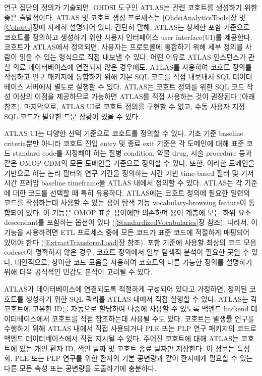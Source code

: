 \documentclass[10.5pt]{book}
\theoremstyle{definition}
\theoremstyle{definition}
\theoremstyle{definition}
\theoremstyle{remark}
\begin{document}
연구 집단의 정의가 기술되면, OHDSI 도구인 ATLAS는 관련 코호트를 생성하기
위한 좋은 출발점이다. ATLAS 및 코호트 생성 프로세스는
\ref{OhdsiAnalyticsTools}장 및 \ref{Cohorts}장에 자세히 설명되어 있다.
간단히 말해, ATLAS는 상세한 포함 기준으로 코호트를 정의하고 생성하기
위한 사용자 인터페이스 user interface(UI)를 제공한다. 코호트가 ATLAS에서
정의되면, 사용자는 프로토콜에 통합하기 위해 세부 정의를 사람이 읽을 수
있는 형식으로 직접 내보낼 수 있다. 어떤 이유로 ATLAS 인스턴스가 관찰
의료 데이터베이스에 연결되지 않은 경우에도, ATLAS를 사용하여 코호트
정의를 작성하고 연구 패키지에 통합하기 위해 기본 SQL 코드를 직접
내보내서 SQL 데이터베이스 서버에서 별도로 실행할 수 있다. ATLAS는 코호트
정의를 위한 SQL 코드 작성 이상의 이점을 제공하므로 가능하면 ATLAS를 직접
사용하는 것이 권장된다 (아래 참조). 마지막으로, ATLAS UI로 코호트 정의를
구현할 수 없고, 수동 사용자 지정 SQL 코드가 필요한 드문 상황이 있을 수
있다.

ATLAS UI는 다양한 선택 기준으로 코호트를 정의할 수 있다. 기초 기준
baseline criteria뿐만 아니라 코호트 진입 entry 및 종료 exit 기준은 각
도메인에 대해 표준 코드 standard code를 지정해야 하는 질병 condition,
약물 drug, 시술 procedure 등과 같은 OMOP CDM의 모든 도메인을 기준으로
정의할 수 있다. 또한, 이러한 도메인을 기반으로 하는 논리 필터와 연구
기간을 정의하는 시간 기반 time-based 필터 및 기저 시간 프레임 baseline
timeframe을 ATLAS 내에서 정의할 수 있다. ATLAS는 각 기준에 대한 코드를
선택할 때 특히 유용하다. ATLAS에는 코호트 정의에 필요한 일련의 코드를
작성하는데 사용할 수 있는 용어 탐색 기능 vocabulary-browsing feature이
통합되어 있다. 이 기능은 OMOP 표준 용어에만 의존하며 용어 계층에 모든
하위 요소 descendant를 포함하는 옵션이 있다
(\ref{StandardizedVocabularies}장 참조). 따라서, 이 기능을 사용하려면
ETL 프로세스 중에 모든 코드가 표준 코드에 적절하게 매핑되어 있어야 한다
(\ref{ExtractTransformLoad}장 참조). 포함 기준에 사용할 최상의 코드 모음
codeset이 명확하지 않은 경우, 코호트 정의에서 일부 탐색적 분석이 필요한
곳일 수 있다. 대안적으로, 상이한 코드 모음을 사용하여 코호트의 다른
가능한 정의를 설명하기 위해 더욱 공식적인 민감도 분석이 고려될 수 있다.

ATLAS가 데이터베이스에 연결되도록 적절하게 구성되어 있다고 가정하면,
정의된 코호트를 생성하기 위한 SQL 쿼리를 ATLAS 내에서 직접 실행할 수
있다. ATLAS는 각 코호트에 고유한 ID를 자동으로 할당하여 나중에 사용할 수
있도록 백엔드 backend 데이터베이스에서 코호트를 직접 참조하는데 사용될
수도 있다. 코호트는 발생률 연구를 수행하기 위해 ATLAS 내에서 직접
사용되거나 PLE 또는 PLP 연구 패키지의 코드로 백엔드 데이터베이스에서
직접 지시될 수 있다. 주어진 코호트에 대해 ATLAS는 코호트에 있는 개인
환자 ID, 색인 날짜 및 코호트 종료 날짜만 저장한다. 이 정보는 특성화, PLE
또는 PLP 연구를 위한 환자의 기본 공변량과 같이 환자에게 필요할 수 있는
다른 모든 속성 또는 공변량을 도출하기에 충분하다.
\end{document}
